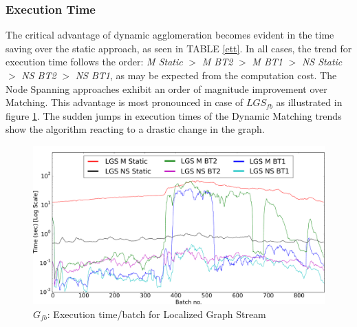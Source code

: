 \documentclass[conference]{IEEEtran}
\begin{document}
\subsubsection{Execution Time}
The critical advantage of dynamic agglomeration becomes evident in the time 
saving over the static approach, as seen in TABLE \ref{ett}. In all cases, the 
trend for execution time follows the order: \emph{M Static} $>$ \emph{M BT2} 
$>$ \emph{M BT1} $>$ \emph{NS Static} $>$ \emph{NS BT2} $>$ \emph{NS BT1}, as 
may be expected from the computation cost. The Node Spanning approaches exhibit 
an order of magnitude improvement over Matching. This advantage is most 
pronounced in case of $LGS_{fb}$ as illustrated in figure \ref{fblgstime}. The 
sudden jumps in execution times of the Dynamic Matching trends show the 
algorithm reacting to a drastic change in the graph.
\begin{figure}
\centering \includegraphics[width=\textwidth]{fb_lgs_time.pdf}
\caption{\label{fblgstime} $G_{fb}$: Execution time/batch 
for Localized Graph Stream\vspace{-0.6cm}}
\end{figure}
\end{document}
